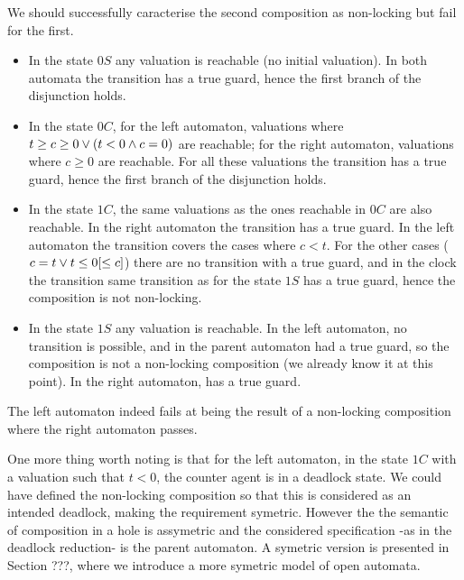 \documentclass{article}
\begin{document}
\begin{exi}
We should successfully caracterise the second composition as non-locking but fail for the first.
\begin{itemize}
\item In the state \(0S\) any valuation is reachable (no initial valuation).
	In both automata the transition  has a true guard, hence the first branch of the disjunction holds.
\item In the state \(0C\), for the left automaton, valuations where \(t \geq c \geq 0 \vee {\left(t < 0 \wedge c = 0\right)}\) are reachable; for the right automaton, valuations where \(c \geq 0\) are reachable.
	For all these valuations the transition  has a true guard, hence the first branch of the disjunction holds.
\item In the state \(1C\), the same valuations as the ones reachable in \(0C\) are also reachable.
	In the right automaton the transition  has a true guard.
	In the left automaton the transition  covers the cases where \(c < t\).
	For the other cases (\(c = t \vee t \leq 0 {\left[\leq c\right]}\)) there are no transition with a true guard, and in the clock the transition same transition as for the state \(1S\) has a true guard, hence the composition is not non-locking.
\item In the state \(1S\) any valuation is reachable.
	In the left automaton, no transition is possible, and in the parent automaton  had a true guard, so the composition is not a non-locking composition (we already know it at this point).
	In the right automaton,  has a true guard.
\end{itemize}
The left automaton indeed fails at being the result of a non-locking composition where the right automaton passes.

One more thing worth noting is that for the left automaton, in the state \(1C\) with a valuation such that \(t < 0\), the counter agent is in a deadlock state.
We could have defined the non-locking composition so that this is considered as an intended deadlock, making the requirement symetric.
However the the semantic of composition in a hole is assymetric and the considered specification -as in the deadlock reduction- is the parent automaton.
A symetric version is presented in Section ???, where we introduce a more symetric model of open automata.
\end{exi}
\end{document}
